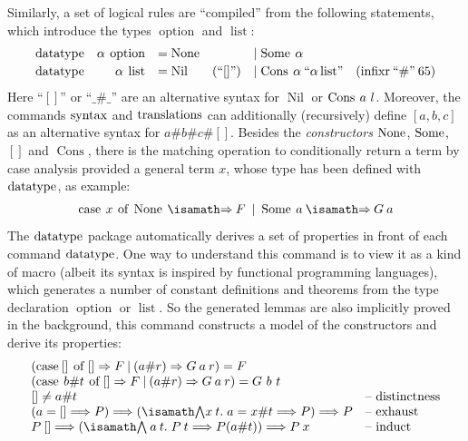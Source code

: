 Similarly, a set of logical rules are ``compiled'' from the following
statements, which introduce the types $\operatorname{option}$ and
$\operatorname{list}$:
\begin{gather*}
  \begin{array}{lrlll}
    {\operatorname{datatype}} & \alpha \: \operatorname{option}      &= \operatorname{None} &&\mid \operatorname{Some} \: \alpha\\[.5ex]
    {\operatorname{datatype}} & \alpha \: \operatorname{list} &= \operatorname{Nil} & (\text{``[]''}) &\mid \operatorname{Cons}\: \alpha \: \text{``$\alpha \operatorname{list}$''} \quad ({\operatorname{infixr}} \: \text{``\#''} \: 65)
  \end{array}
\end{gather*}
Here ``$[]$'' or ``$\_ \# \_$'' are an alternative syntax for
$\operatorname{Nil}$ or $\operatorname{Cons}\: a ~l$. Moreover, the
commands $\operatorname{syntax}$ and
$\operatorname{translations}$
can additionally (recursively) define $[a, b, c]$ as an alternative
syntax for $a\#b\#c\#[]$. Besides the \emph{constructors} $\operatorname{None}$,
$\operatorname{Some}$, $[]$ and $\operatorname{Cons}$, there is the matching
operation to conditionally return a term by case analysis provided a
general term $x$, whose type has been defined with ${\operatorname{datatype}}$, as
example:
\begin{gather*}
\HolCase\ap x\ap\HolOf \ap \operatorname{None} \ap \isasymRightarrow \ap F\ap \mid \ap
\operatorname{Some} \ap a \ap \isasymRightarrow \ap G\ap a
\end{gather*}
The ${\operatorname{datatype}}$ package automatically derives a set of properties in
front of each command
${\operatorname{datatype}}$. One
way to understand this command is to view it as a kind of macro
(albeit its syntax is inspired by functional programming languages),
which generates a number of constant definitions and theorems from the
type declaration $\operatorname{option}$ or $\operatorname{list}$. So
the generated lemmas are also implicitly proved in the background,
this command constructs a model of the constructors and derive its
properties:
\begin{gather*}
  \begin{array}{ll}
    (\HolCase\ap[]\ap\HolOf\ap[] \Rightarrow F  \ap | \ap  (a\#r) \Rightarrow
    G\ap a\ap r) = F &\\
    (\HolCase \ap  b\#t  \ap \HolOf  \ap [] \Rightarrow F  \ap  | \ap
    (a\#r) \Rightarrow G\ap a\ap r) = G~b~t &\\ %
    \mbox{}[] \neq a\#t    &\text{-- distinctness} \\
    (a = [] \Longrightarrow P) \Longrightarrow
    (\Forall x \ap t\spot  a = x\#t \Longrightarrow P) \Longrightarrow
    P &\text{-- exhaust} \\
    P \ap [] \Longrightarrow ( \Forall \ap a \ap t\spot P \ap t \Longrightarrow  P (a\#t) ) \Longrightarrow P \ap x      &\text{-- induct}
  \end{array}
\end{gather*}
